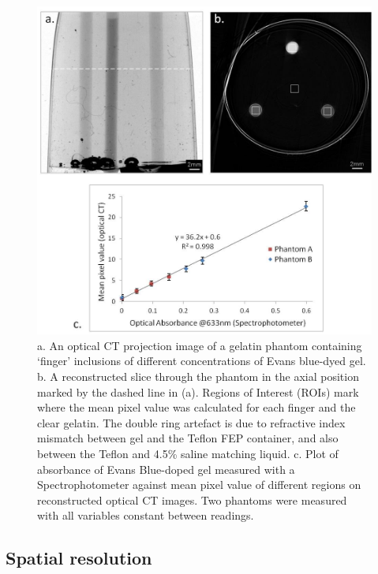 	\begin{figure}[H]
		\centering
		\includegraphics[width=1\textwidth]{meth_img/EB_rod_new.jpg}
		\caption{a. An optical CT projection image of a gelatin phantom containing `finger' inclusions of different concentrations of Evans blue-dyed gel. b. A reconstructed slice through the phantom in the axial position marked by the dashed line in (a). Regions of Interest (ROIs) mark where the mean pixel value was calculated for each finger and the clear gelatin. The double ring artefact is due to refractive index mismatch between gel and the Teflon FEP container, and also between the Teflon and 4.5\% saline matching liquid. c. Plot of absorbance of Evans Blue-doped gel measured with a Spectrophotometer against mean pixel value of different regions on reconstructed optical CT images. Two phantoms were measured  with all  variables constant between readings.}
		\label{fig:fingerphantoms_roi_EB}
	\end{figure}
	






\subsection{Spatial resolution}
\label{subsec:spat_res}

